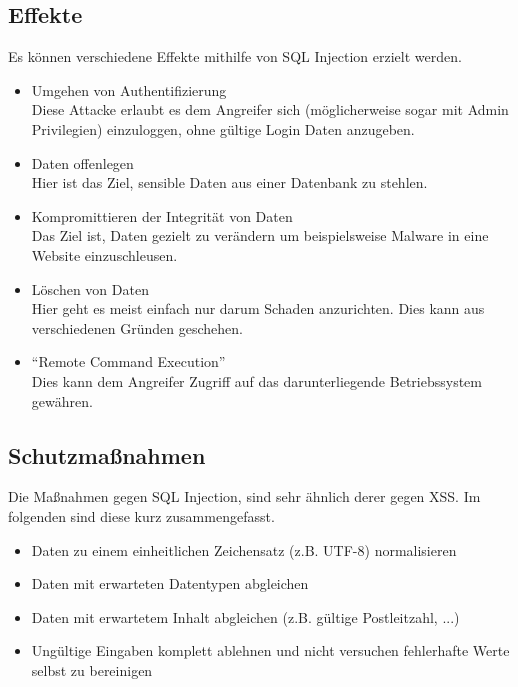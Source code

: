 \subsection{Effekte}
Es k\"onnen verschiedene Effekte mithilfe von SQL Injection erzielt werden.
\begin{itemize}
\item Umgehen von Authentifizierung\\
Diese Attacke erlaubt es dem Angreifer sich (m\"oglicherweise sogar mit Admin Privilegien) einzuloggen, ohne g\"ultige Login Daten anzugeben.\\
\item Daten offenlegen\\
Hier ist das Ziel, sensible Daten aus einer Datenbank zu stehlen.\\
\item Kompromittieren der Integrit\"at von Daten\\
Das Ziel ist, Daten gezielt zu ver\"andern um beispielsweise Malware in eine Website einzuschleusen.\\
\item L\"oschen von Daten\\
Hier geht es meist einfach nur darum Schaden anzurichten. Dies kann aus verschiedenen Gr\"unden geschehen.\\
\item ``Remote Command Execution''\\
Dies kann dem Angreifer Zugriff auf das darunterliegende Betriebssystem gew\"ahren.
\end{itemize}

\cite{ciscoSQLInjection}

\subsection{Schutzma{\ss}nahmen}
Die Ma{\ss}nahmen gegen SQL Injection, sind sehr \"ahnlich derer gegen XSS. Im folgenden sind diese kurz zusammengefasst.
\begin{itemize}
\item Daten zu einem einheitlichen Zeichensatz (z.B. UTF-8) normalisieren
\item Daten mit erwarteten Datentypen abgleichen
\item Daten mit erwartetem Inhalt abgleichen (z.B. g\"ultige Postleitzahl, ...)
\item Ung\"ultige Eingaben komplett ablehnen und nicht versuchen fehlerhafte Werte selbst zu bereinigen
\end{itemize}
\cite{hackingWebAppsBuch}


